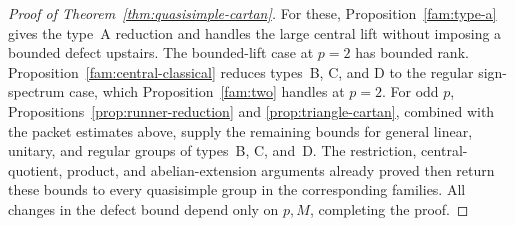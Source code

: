 \begin{proof}[Proof of Theorem~\ref{thm:quasisimple-cartan}]
For these, Proposition~\ref{fam:type-a} gives the type~A
reduction and handles the large central lift without imposing
a bounded defect upstairs.  The bounded-lift case at \(p=2\)
has bounded rank.  Proposition~\ref{fam:central-classical}
reduces types~B, C, and D to the regular sign-spectrum case,
which Proposition~\ref{fam:two} handles at \(p=2\).
For odd \(p\), Propositions~\ref{prop:runner-reduction} and
\ref{prop:triangle-cartan}, combined with the packet estimates above,
supply the remaining bounds for general linear, unitary, and regular
groups of types~B, C, and~D.  The restriction,
central-quotient, product, and abelian-extension arguments
already proved then return these bounds to every quasisimple
group in the corresponding families.  All changes in the
defect bound depend only on \(p,M\), completing the proof.
\end{proof}
